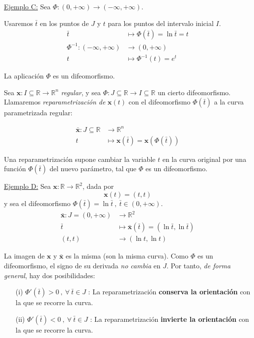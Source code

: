 \begin{mybox}
    \underline{Ejemplo C:} Sea $\Phi :(0,+\infty)\longrightarrow (-\infty,+\infty)$.

    Usaremos $\bar{t}$ en los puntos de $J$ y $t$ para los puntos del intervalo inicial $I$.
    \begin{align*}
        \bar{t}&\longmapsto \Phi(\bar{t})=\ln{\bar{t}}=t\\
        \Phi^{-1}:(-\infty, +\infty )&\longrightarrow (0,+\infty)\\
        t &\longmapsto \Phi^{-1}(t)=e^t
    \end{align*}

    La aplicación $\Phi$ es un difeomorfismo.
\end{mybox}

Sea $\mathbf{x}:I\subseteq \mathbb{R}\longrightarrow \mathbb{R}^n$ \emph{regular}, y sea $\Phi:J\subseteq \mathbb{R}\longrightarrow I\subseteq \mathbb{R}$ un cierto difeomorfismo. Llamaremos \emph{reparametrización de }$\mathbf{x}(t)$ con el difeomorfismo $\Phi (\bar{t})$ a la curva parametrizada regular:

\begin{align*}
    \mathbf{\bar{x}}:J\subseteq \mathbb{R}&\longrightarrow \mathbb{R}^n\\
    t&\longmapsto \mathbf{x}(\bar{t})=\mathbf{x}(\Phi(\bar{t}))
\end{align*}

Una reparametrización supone cambiar la variable $t$ en la curva original por una función $\Phi(\bar{t})$ del nuevo parámetro, tal que $\Phi$ es un difeomorfismo.\\

\begin{mybox}
    \underline{Ejemplo D:} Sea $\mathbf{x}:\mathbb{R}\longrightarrow \mathbb{R}^2$, dada por
    $$
    \mathbf{x}(t)=(t,t)
    $$
    y sea el difeomorfismo $\Phi(\bar{t})=\ln{\bar{t}} \ , \ \bar{t}\in (0,+\infty)$.
    \begin{align*}
        \mathbf{\bar{x}}:J=(0,+\infty)&\longrightarrow \mathbb{R}^2\\
        \bar{t}&\longmapsto \mathbf{\bar{x}}(\bar{t})=(\ln{\bar{t}},\ln{\bar{t}})\\
        (t,t)&\longrightarrow (\ln{t},\ln{t})
    \end{align*}

    La imagen de $\mathbf{x}$ y $\mathbf{\bar{x}}$ es la misma (son la misma curva). Como $\Phi$ es un difeomorfismo, el signo de su derivada \emph{no cambia} en $J$. Por tanto, \emph{de forma general}, hay dos posibilidades:
    \begin{enumerate}
        \item[(i)] $\Phi'(\bar{t})>0 \ , \ \forall \ \bar{t} \in J$ : La reparametrización \textbf{conserva la orientación} con la que se recorre la curva.
        \item[(ii)] $\Phi'(\bar{t})<0 \ , \ \forall \ \bar{t} \in J$ : La reparametrización \textbf{invierte la orientación} con la que se recorre la curva.
    \end{enumerate}
\end{mybox}

